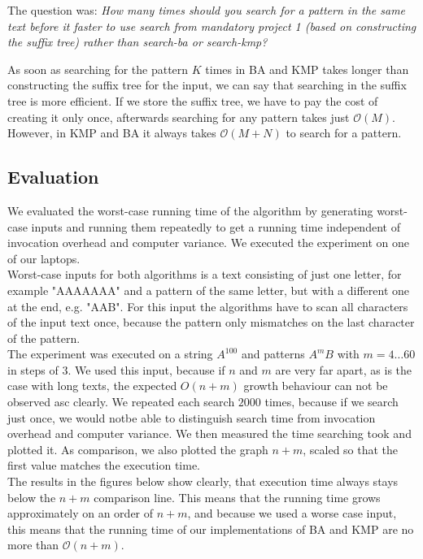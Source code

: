 \documentclass[a4paper,10pt]{article}
\begin{document}
The question was:
\emph{How many times should you search for a pattern in the same text before it faster to use search from mandatory project 1 (based on constructing the suffix tree) rather than search-ba or search-kmp?}

As soon as searching for the pattern $K$ times in BA and KMP takes longer
than constructing the suffix tree for the input, we can say that searching in
the suffix tree is more efficient.
If we store the suffix tree, we have to pay the cost of creating it only once,
afterwards searching for any pattern takes just $\mathcal{O}(M)$.
However, in KMP and BA it always takes $\mathcal{O}(M+N)$ to search for a pattern.
\clearpage

\subsection*{Evaluation}
We evaluated the worst-case running time of the algorithm by generating worst-case inputs and running them repeatedly to get a running time independent of invocation overhead and computer variance. We executed the experiment on one of our laptops.\\

Worst-case inputs for both algorithms is a text consisting of just one letter, for example "AAAAAAA" and a pattern of the same letter, but with a different one at the end, e.g. "AAB". For this input the algorithms have to scan all characters of the input text once, because the pattern only mismatches on the last character of the pattern.\\

The experiment was executed on a string $A^{100}$ and patterns $A^{m}B$ with $m = 4\ldots60$ in steps of 3. We used this input, because if $n$ and $m$ are very far apart, as is the case with long texts, the expected $O(n+m)$ growth behaviour can not be observed asc clearly. We repeated each search $2000$ times, because if we search just once, we would notbe able to distinguish search time from invocation overhead and computer variance. We then measured the time searching took and plotted it. As comparison, we also plotted the graph $n+m$, scaled so that the first value matches the execution time.\\

The results in the figures below show clearly, that execution time always stays below the $n+m$ comparison line. This means that the running time grows approximately on an order of $n+m$, and because we used a worse case input, this means that the running time of our implementations of BA and KMP are no more than $\mathcal{O}(n+m)$. 
\end{document}
